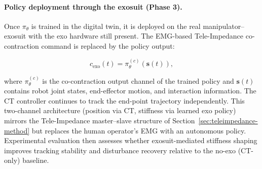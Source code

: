 \documentclass[11pt, a4paper]{article}
\begin{document}
\paragraph{Policy deployment through the exosuit (Phase 3).}
Once $\pi_\theta$ is trained in the digital twin, it is deployed on the real
manipulator--exosuit with the exo hardware still present. The EMG-based
Tele-Impedance co-contraction command is replaced by the policy output:

\begin{equation}
  c_{\text{exo}}(t) = \pi_\theta^{(c)}(\bm{s}(t)),
\end{equation}

where $\pi_\theta^{(c)}$ is the co-contraction output channel of the trained
policy and $\bm{s}(t)$ contains robot joint states, end-effector motion, and
interaction information.  The CT controller continues to track the end-point
trajectory independently.  This two-channel architecture (position via CT,
stiffness via learned exo policy) mirrors the Tele-Impedance master--slave
structure of Section~\ref{sec:teleimpedance-method} but replaces the human
operator's EMG with an autonomous policy.  Experimental evaluation then
assesses whether exosuit-mediated stiffness shaping improves tracking
stability and disturbance recovery relative to the no-exo (CT-only) baseline.
\end{document}
